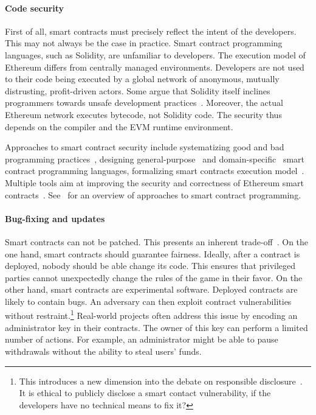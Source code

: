 \paragraph{Code security}
First of all, smart contracts must precisely reflect the intent of the developers.
This may not always be the case in practice.
Smart contract programming languages, such as Solidity, are unfamiliar to developers.
The execution model of Ethereum differs from centrally managed environments.
Developers are not used to their code being executed by a global network of anonymous, mutually distrusting, profit-driven actors.
Some argue that Solidity itself inclines programmers towards unsafe development practices~\cite{ydtm2016}.
Moreover, the actual Ethereum network executes bytecode, not Solidity code.
The security thus depends on the compiler and the EVM runtime environment.

Approaches to smart contract security include systematizing good and bad programming practices~\cite{ConsenSys16, Chen2017}, designing general-purpose~\cite{Hirai2017a, Buterin2017b, Pettersson2016} and domain-specific~\cite{EgelundMueller2017} smart contract programming languages, formalizing smart contracts execution model~\cite{Sergey2017}.
Multiple tools aim at improving the security and correctness of Ethereum smart contracts~\cite{Bhargavan2016, Luu2016, Hirai2017, Hildenbrandt2018, Tsankov2018, Jiang2018, Slither, Manticore, Mythril, Echidna}.
See~\cite{Seijas2016} for an overview of approaches to smart contract programming.

\paragraph{Bug-fixing and updates}
Smart contracts can not be patched.
This presents an inherent trade-off~\cite{Porru2017}.
On the one hand, smart contracts should guarantee fairness.
Ideally, after a contract is deployed, nobody should be able change its code.
This ensures that privileged parties cannot unexpectedly change the rules of the game in their favor.
On the other hand, smart contracts are experimental software.
Deployed contracts are likely to contain bugs.
An adversary can then exploit contract vulnerabilities without restraint.\footnote{This introduces a new dimension into the debate on responsible disclosure~\cite{Schneier2007}. It is ethical to publicly disclose a smart contact vulnerability, if the developers have no technical means to fix it?}
Real-world projects often address this issue by encoding an administrator key in their contracts.
The owner of this key can perform a limited number of actions.
For example, an administrator might be able to pause withdrawals without the ability to steal users' funds.

